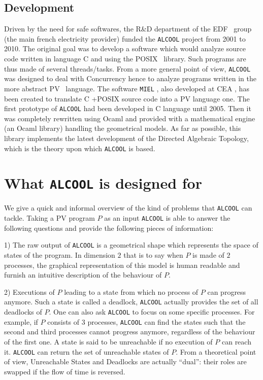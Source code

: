 \documentclass[article,11pt]{amsbook}
\def\alcool{\texttt{ALCOOL} }
\def\miel{\texttt{MIEL} }
\def\edf{{\sf EDF} }
\def\posix{{\sf POSIX} }
\def\cea{{\sf CEA} }
\def\c{{\sf C} }
\def\ocaml{{\sf Ocaml} }
\def\pv{{\sf PV} }
\begin{document}
\subsection{Development}
Driven by the need for safe softwares, the R\&D department of the \edf\
group (the main french electricity provider) funded the \alcool project
from 2001 to 2010. The original goal was to develop a software which
would analyze source code written in language \c and using the \posix\
library. Such programs are thus made of several threads/tasks. From a
more general point of view, \alcool was designed to deal with
Concurrency hence to analyze programs written in the more abstract \pv\
language. The software \miel, also developed at \cea, has been created
to translate \c+\posix source code into a \pv language one. The first
prototype of \alcool had been developed in \c language until 2005. Then
it was completely rewritten using \ocaml and provided with a
mathematical engine (an \ocaml library) handling the geometrical
models. As far as possible, this library implements the latest
development of the Directed Algebraic Topology, which is the theory upon
which \alcool is based.
\section{What \alcool is designed for}
We give a quick and informal overview of the kind of problems that
\alcool can tackle. Taking a \pv program $P$ as an input \alcool is able
to answer the following questions and provide the following pieces of
information:

1) The raw output of \alcool is a geometrical shape which represents the
space of states of the program. In dimension $2$ that is to say when $P$
is made of $2$ processes, the graphical representation of this model is
human readable and furnish an intuitive description of the behaviour of
$P$.

2) Executions of $P$ leading to a state from which no process of $P$ can
progress anymore. Such a state is called a deadlock, \alcool actually
provides the set of all deadlocks of $P$. One can also ask \alcool to
focus on some specific processes. For example, if $P$ consists of $3$
processes, \alcool can find the states such that the second and third
processes cannot progress anymore, regardless of the behaviour of the
first one. A state is said to be unreachable if no execution of $P$ can
reach it. \alcool can return the set of unreachable states of $P$. From
a theoretical point of view, Unreachable States and Deadlocks are
actually ``dual'': their roles are swapped if the flow of time is
reversed.
\end{document}
